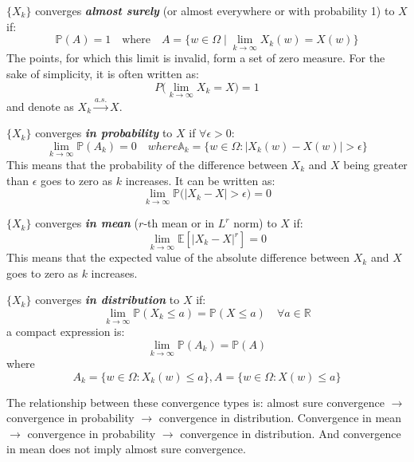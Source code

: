\documentclass[10pt]{elegantbook}
\newcommand{\mydefination}[1]{\textbf{\textit{\textcolor{structurecolor}{#1}}}}
\begin{document}
\begin{definition}
    $\{ X_k \}$ converges \mydefination{almost surely} (or almost everywhere or with probability 1) to $X$ if:
    \[ \mathbb P(A) = 1 \quad \text{where} \quad A = \{ w \in \Omega \mid \lim_{k \rightarrow \infty} X_k(w) = X(w) \} \]
    The points, for which this limit is invalid, form a set of zero measure. For the sake of simplicity, it is often written as:
    \[ P \big ( \lim_{k \rightarrow \infty} X_k = X \big ) = 1 \]
    and denote as $X_k \xrightarrow{a.s.} X$.
\end{definition}

\begin{definition}
    $\{ X_k \}$ converges \mydefination{in probability} to $X$ if $\forall \epsilon > 0$:
    \[ \lim_{k \rightarrow \infty} \mathbb P(A_k) = 0 \quad where  \mathbb A_k = \{ w \in \Omega : |X_k(w) - X(w)| > \epsilon \} \]
    This means that the probability of the difference between $X_k$ and $X$ being greater than $\epsilon$ goes to zero as $k$ increases.
    It can be written as:
    \[ \lim_{k \rightarrow \infty} \mathbb P \big ( |X_k - X| > \epsilon \big ) = 0 \]
\end{definition}

\begin{definition}
    $\{ X_k \}$ converges \mydefination{in mean} ($r$-th mean or in $L^r$ norm) to $X$ if:
    \[ \lim_{k \rightarrow \infty} \mathbb E[|X_k - X|^r] = 0 \]
    This means that the expected value of the absolute difference between $X_k$ and $X$ goes to zero as $k$ increases.
\end{definition}

\begin{definition}
    $\{ X_k \}$ converges \mydefination{in distribution} to $X$ if:
    \[ \lim_{k \rightarrow \infty} \mathbb P(X_k \leq a) = \mathbb P(X \leq a) \quad \forall a \in \mathbb R \]
    a compact expression is:
    \[ \lim_{k \rightarrow \infty} \mathbb P(A_k) = \mathbb P(A) \]
    where
    \[ A_k = \{ w \in \Omega : X_k(w) \leq a \}, A = \{ w \in \Omega : X(w) \leq a \} \]
\end{definition}

The relationship between these convergence types is:
almost sure convergence $\rightarrow$ convergence in probability $\rightarrow$ convergence in distribution.
Convergence in mean $\rightarrow$ convergence in probability $\rightarrow$ convergence in distribution.
And convergence in mean does not imply almost sure convergence.
\end{document}
